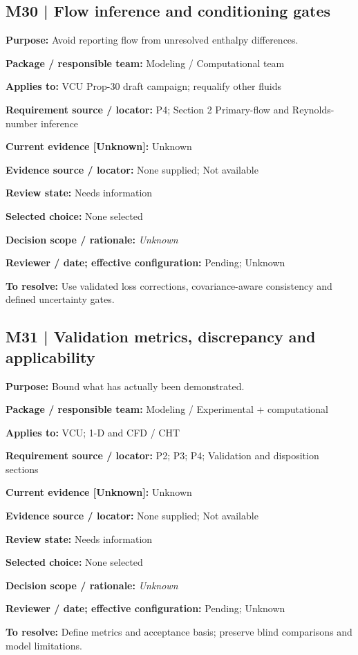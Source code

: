 \documentclass[11pt]{article}
\begin{document}
\begin{minipage}{\textwidth}\small\setlength{\parskip}{2pt}
\subsection*{M30 | Flow inference and conditioning gates}
\textbf{Purpose:} Avoid reporting flow from unresolved enthalpy differences.\par
\textbf{Package / responsible team:} Modeling / Computational team\par
\textbf{Applies to:} VCU Prop-30 draft campaign; requalify other fluids\par
\textbf{Requirement source / locator:} P4; Section 2 Primary-flow and Reynolds-number inference\par
\textbf{Current evidence [Unknown]:} Unknown\par
\textbf{Evidence source / locator:} None supplied; Not available\par
\textbf{Review state:} Needs information\par
\textbf{Selected choice:} None selected\par
\textbf{Decision scope / rationale:} \textit{Unknown}\par
\textbf{Reviewer / date; effective configuration:} Pending; Unknown\par
\textbf{To resolve:} Use validated loss corrections, covariance-aware consistency and defined uncertainty gates.\par
\end{minipage}\par\vspace{5pt}
\begin{minipage}{\textwidth}\small\setlength{\parskip}{2pt}
\subsection*{M31 | Validation metrics, discrepancy and applicability}
\textbf{Purpose:} Bound what has actually been demonstrated.\par
\textbf{Package / responsible team:} Modeling / Experimental + computational\par
\textbf{Applies to:} VCU; 1-D and CFD / CHT\par
\textbf{Requirement source / locator:} P2; P3; P4; Validation and disposition sections\par
\textbf{Current evidence [Unknown]:} Unknown\par
\textbf{Evidence source / locator:} None supplied; Not available\par
\textbf{Review state:} Needs information\par
\textbf{Selected choice:} None selected\par
\textbf{Decision scope / rationale:} \textit{Unknown}\par
\textbf{Reviewer / date; effective configuration:} Pending; Unknown\par
\textbf{To resolve:} Define metrics and acceptance basis; preserve blind comparisons and model limitations.\par
\end{minipage}\par\vspace{5pt}
\end{document}
